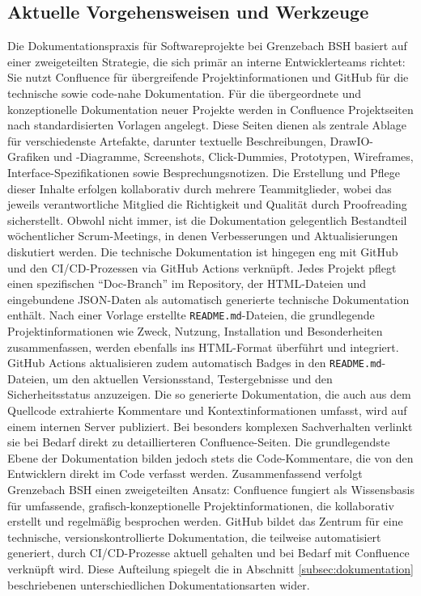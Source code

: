 \documentclass[12pt,oneside]{article}
\begin{document}
    \subsection{Aktuelle Vorgehensweisen und Werkzeuge}
    \label{subsec:dokument_werkzeuge}
    Die Dokumentationspraxis für Softwareprojekte bei Grenzebach BSH basiert auf einer zweigeteilten Strategie, die sich primär an interne Entwicklerteams richtet: Sie nutzt Confluence für übergreifende Projektinformationen und GitHub für die technische sowie code-nahe Dokumentation.
    \newline
    Für die übergeordnete und konzeptionelle Dokumentation neuer Projekte werden in Confluence Projektseiten nach standardisierten Vorlagen angelegt. Diese Seiten dienen als zentrale Ablage für verschiedenste Artefakte, darunter textuelle Beschreibungen, DrawIO-Grafiken und -Diagramme, Screenshots, Click-Dummies, Prototypen, Wireframes, Interface-Spezifikationen sowie Besprechungsnotizen. Die Erstellung und Pflege dieser Inhalte erfolgen kollaborativ durch mehrere Teammitglieder, wobei das jeweils verantwortliche Mitglied die Richtigkeit und Qualität durch Proofreading sicherstellt. Obwohl nicht immer, ist die Dokumentation gelegentlich Bestandteil wöchentlicher Scrum-Meetings, in denen Verbesserungen und Aktualisierungen diskutiert werden.
    \newline
    Die technische Dokumentation ist hingegen eng mit GitHub und den CI/CD-Prozessen via GitHub Actions verknüpft. Jedes Projekt pflegt einen spezifischen ``Doc-Branch'' im Repository, der HTML-Dateien und eingebundene JSON-Daten als automatisch generierte technische Dokumentation enthält. Nach einer Vorlage erstellte \texttt{README.md}-Dateien, die grundlegende Projektinformationen wie Zweck, Nutzung, Installation und Besonderheiten zusammenfassen, werden ebenfalls ins HTML-Format überführt und integriert. GitHub Actions aktualisieren zudem automatisch Badges in den \texttt{README.md}-Dateien, um den aktuellen Versionsstand, Testergebnisse und den Sicherheitsstatus anzuzeigen. Die so generierte Dokumentation, die auch aus dem Quellcode extrahierte Kommentare und Kontextinformationen umfasst, wird auf einem internen Server publiziert. Bei besonders komplexen Sachverhalten verlinkt sie bei Bedarf direkt zu detaillierteren Confluence-Seiten. Die grundlegendste Ebene der Dokumentation bilden jedoch stets die Code-Kommentare, die von den Entwicklern direkt im Code verfasst werden.
    \newline
    Zusammenfassend verfolgt Grenzebach BSH einen zweigeteilten Ansatz: Confluence fungiert als Wissensbasis für umfassende, grafisch-konzeptionelle Projektinformationen, die kollaborativ erstellt und regelmäßig besprochen werden. GitHub bildet das Zentrum für eine technische, versionskontrollierte Dokumentation, die teilweise automatisiert generiert, durch CI/CD-Prozesse aktuell gehalten und bei Bedarf mit Confluence verknüpft wird. Diese Aufteilung spiegelt die in Abschnitt \ref{subsec:dokumentation} beschriebenen unterschiedlichen Dokumentationsarten wider.
\end{document}
